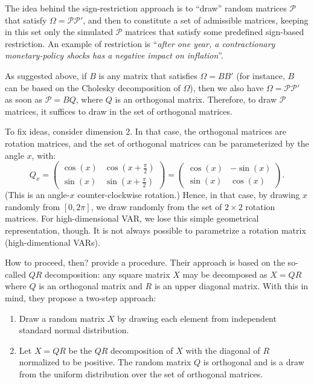 \documentclass[
  12pt,
]{book}
\providecommand{\tightlist}{%
  \setlength{\itemsep}{0pt}\setlength{\parskip}{0pt}}
\theoremstyle{definition}
\theoremstyle{definition}
\theoremstyle{definition}
\theoremstyle{definition}
\theoremstyle{remark}
\begin{document}
The idea behind the sign-restriction approach is to ``draw'' random matrices \(\mathcal{P}\) that satisfy \(\Omega = \mathcal{P}\mathcal{P}'\), and then to constitute a set of admissible matrices, keeping in this set only the simulated \(\mathcal{P}\) matrices that satisfy some predefined sign-based restriction. An example of restriction is ``\emph{after one year, a contractionary monetary-policy shocks has a negative impact on inflation}''.

As suggested above, if \(B\) is any matrix that satisfies \(\Omega = BB'\) (for instance, \(B\) can be based on the Cholesky decomposition of \(\Omega\)), then we also have \(\Omega = \mathcal{P}\mathcal{P}'\) as soon as \(\mathcal{P}=BQ\), where \(Q\) is an orthogonal matrix. Therefore, to draw \(\mathcal{P}\) matrices, it suffices to draw in the set of orthogonal matrices.

To fix ideas, consider dimension 2. In that case, the orthogonal matrices are rotation matrices, and the set of orthogonal matrices can be parameterized by the angle \(x\), with:
\[
Q_x=\begin{pmatrix}\cos(x)&\cos\left(x+\frac{\pi}{2}\right)\\
\sin(x)&\sin\left(x+\frac{\pi}{2}\right)\end{pmatrix}=\begin{pmatrix}\cos(x)&-\sin(x)\\
\sin(x)&\cos(x)\end{pmatrix}.
\]
(This is an angle-\(x\) counter-clockwise rotation.) Hence, in that case, by drawing \(x\) randomly from \([0,2\pi]\), we draw randomly from the set of \(2\times2\) rotation matrices. For high-dimensional VAR, we lose this simple geometrical representation, though. It is not always possible to parametrize a rotation matrix (high-dimentional VARs).

How to proceed, then? \citet{Arias_et_al_2018} provide a procedure. Their approach is based on the so-called \(QR\) decomposition: any square matrix \(X\) may be decomposed as \(X=QR\) where \(Q\) is an orthogonal matrix and \(R\) is an upper diagonal matrix. With this in mind, they propose a two-step approach:

\begin{enumerate}
\def\labelenumi{\roman{enumi}.}
\tightlist
\item
  Draw a random matrix \(X\) by drawing each element from independent standard normal distribution.
\item
  Let \(X = QR\) be the \(QR\) decomposition of \(X\) with the diagonal of \(R\) normalized to be
  positive. The random matrix \(Q\) is orthogonal and is a draw from the uniform distribution over the set of orthogonal matrices.
\end{enumerate}
\end{document}
